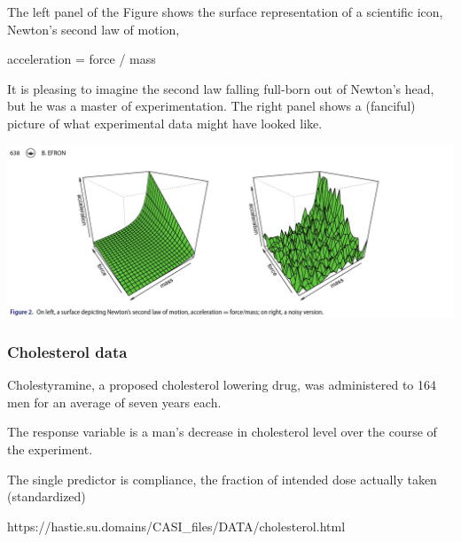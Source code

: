 \begin{frame}[fragile]

The left panel of the Figure shows the surface representation of
a scientific icon, Newton’s second law of motion,

acceleration = force / mass

It is pleasing to imagine the second law falling full-born out of
Newton’s head, but he was a master of experimentation. The
right panel shows a (fanciful) picture of what experimental data
might have looked like.

\includegraphics[scale=.2]{images/Figure_2}

\end{frame}
\begin{frame}[fragile]\frametitle{Cholesterol data}

\bi
\item Cholestyramine, a proposed cholesterol lowering drug, was administered to 164 men for an average of seven years each.

\item The response variable is a man's decrease in cholesterol level over the course of the experiment.

\item The single predictor is compliance, the fraction of intended dose actually taken (standardized)

\item https://hastie.su.domains/CASI\_files/DATA/cholesterol.html
\ei

\end{frame}
